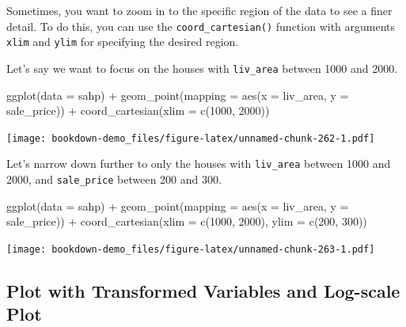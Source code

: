 \documentclass[
]{book}
\newenvironment{Shaded}{\begin{snugshade}}{\end{snugshade}}
\newcommand{\AttributeTok}[1]{\textcolor[rgb]{0.77,0.63,0.00}{#1}}
\newcommand{\DecValTok}[1]{\textcolor[rgb]{0.00,0.00,0.81}{#1}}
\newcommand{\FunctionTok}[1]{\textcolor[rgb]{0.00,0.00,0.00}{#1}}
\newcommand{\NormalTok}[1]{#1}
\newcommand{\SpecialCharTok}[1]{\textcolor[rgb]{0.00,0.00,0.00}{#1}}
\begin{document}
Sometimes, you want to zoom in to the specific region of the data to see a finer detail. To do this, you can use the \texttt{coord\_cartesian()} function with arguments \texttt{xlim} and \texttt{ylim} for specifying the desired region.

Let's say we want to focus on the houses with \texttt{liv\_area} between 1000 and 2000.

\begin{Shaded}
\begin{Highlighting}[]
\FunctionTok{ggplot}\NormalTok{(}\AttributeTok{data =}\NormalTok{ sahp) }\SpecialCharTok{+} \FunctionTok{geom\_point}\NormalTok{(}\AttributeTok{mapping =} \FunctionTok{aes}\NormalTok{(}\AttributeTok{x =}\NormalTok{ liv\_area, }\AttributeTok{y =}\NormalTok{ sale\_price))  }\SpecialCharTok{+}
  \FunctionTok{coord\_cartesian}\NormalTok{(}\AttributeTok{xlim =} \FunctionTok{c}\NormalTok{(}\DecValTok{1000}\NormalTok{, }\DecValTok{2000}\NormalTok{))}
\end{Highlighting}
\end{Shaded}

\texttt{[image: bookdown-demo\_files/figure-latex/unnamed-chunk-262-1.pdf]}

Let's narrow down further to only the houses with \texttt{liv\_area} between 1000 and 2000, and \texttt{sale\_price} between 200 and 300.

\begin{Shaded}
\begin{Highlighting}[]
\FunctionTok{ggplot}\NormalTok{(}\AttributeTok{data =}\NormalTok{ sahp) }\SpecialCharTok{+} \FunctionTok{geom\_point}\NormalTok{(}\AttributeTok{mapping =} \FunctionTok{aes}\NormalTok{(}\AttributeTok{x =}\NormalTok{ liv\_area, }\AttributeTok{y =}\NormalTok{ sale\_price))  }\SpecialCharTok{+}
  \FunctionTok{coord\_cartesian}\NormalTok{(}\AttributeTok{xlim =} \FunctionTok{c}\NormalTok{(}\DecValTok{1000}\NormalTok{, }\DecValTok{2000}\NormalTok{), }\AttributeTok{ylim =} \FunctionTok{c}\NormalTok{(}\DecValTok{200}\NormalTok{, }\DecValTok{300}\NormalTok{))}
\end{Highlighting}
\end{Shaded}

\texttt{[image: bookdown-demo\_files/figure-latex/unnamed-chunk-263-1.pdf]}

\hypertarget{plot-with-transformed-variables-and-log-scale-plot}{%
\subsection{Plot with Transformed Variables and Log-scale Plot}\label{plot-with-transformed-variables-and-log-scale-plot}}
\end{document}
